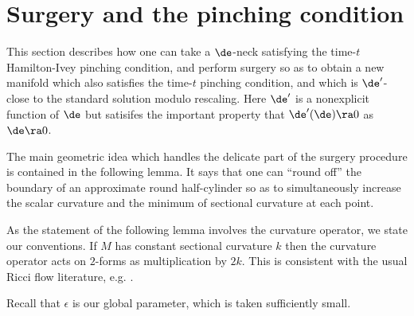 \section{Surgery and the pinching condition} \label{surgery}

This section describes how one can take a $\de$-neck
satisfying the time-$t$ Hamilton-Ivey pinching condition,
and perform surgery so as to obtain a new manifold which also satisfies
the time-$t$ pinching condition, and which is $\de'$-close to the
standard solution modulo rescaling.
Here $\de'$ is a nonexplicit function of $\de$ but satisifes the important
property that  $\de'(\de)\ra 0$ as $\de\ra 0$.



The main geometric idea which handles the delicate part of the surgery
procedure is contained in the following lemma.  It says that one can ``round off''
the boundary of an approximate round half-cylinder so as to simultaneously
increase the scalar curvature  and  the minimum of sectional curvature at each
point.

As the statement of the following lemma involves the curvature
operator, we state our conventions. If $M$ has constant sectional
curvature $k$ then the curvature operator acts on $2$-forms as
multiplication by $2k$.  This is consistent with the usual
Ricci flow literature, e.g. \cite{Chow-Knopf}.

Recall that $\epsilon$ is our global parameter, which is taken
sufficiently small.

